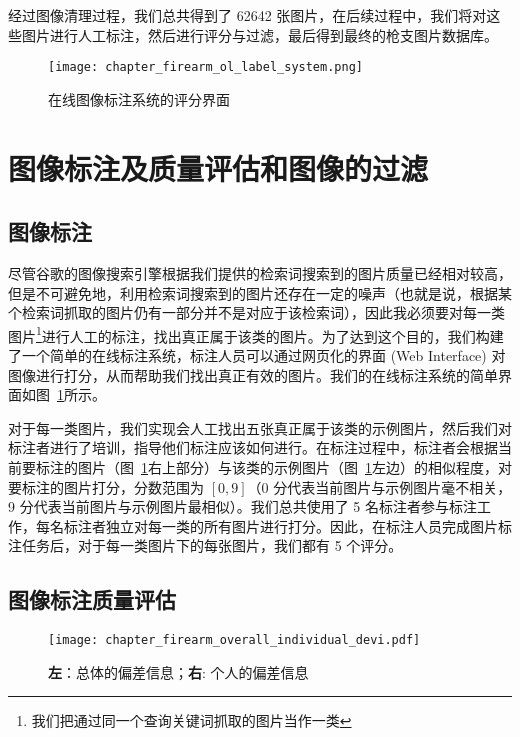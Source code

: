 经过图像清理过程，我们总共得到了 62642 张图片，在后续过程中，我们将对这些图片进行人工标注，然后进行评分与过滤，最后得到最终的枪支图片数据库。
\begin{figure}[t]
	\centering
	\texttt{[image: chapter\_firearm\_ol\_label\_system.png]}
	\caption{在线图像标注系统的评分界面}
	\label{fig:online_label_system}
\end{figure}

\section{图像标注及质量评估和图像的过滤}\label{sec:image_label_filtering}

\subsection{图像标注}
尽管谷歌的图像搜索引擎根据我们提供的检索词搜索到的图片质量已经相对较高，但是不可避免地，利用检索词搜索到的图片还存在一定的噪声（也就是说，根据某个检索词抓取的图片仍有一部分并不是对应于该检索词），因此我必须要对每一类图片\footnote{我们把通过同一个查询关键词抓取的图片当作一类}进行人工的标注，找出真正属于该类的图片。为了达到这个目的，我们构建了一个简单的在线标注系统，标注人员可以通过网页化的界面 (Web Interface) 对图像进行打分，从而帮助我们找出真正有效的图片。我们的在线标注系统的简单界面如图~\ref{fig:online_label_system}所示。


对于每一类图片，我们实现会人工找出五张真正属于该类的示例图片，然后我们对标注者进行了培训，指导他们标注应该如何进行。在标注过程中，标注者会根据当前要标注的图片（图~\ref{fig:online_label_system}右上部分）与该类的示例图片（图~\ref{fig:online_label_system}左边）的相似程度，对要标注的图片打分，分数范围为 $[0,9]$（0 分代表当前图片与示例图片毫不相关，9 分代表当前图片与示例图片最相似）。我们总共使用了 5 名标注者参与标注工作，每名标注者独立对每一类的所有图片进行打分。因此，在标注人员完成图片标注任务后，对于每一类图片下的每张图片，我们都有 5 个评分。

\subsection{图像标注质量评估}

\begin{figure}[t]
	\centering
	\texttt{[image: chapter\_firearm\_overall\_individual\_devi.pdf]}
	\caption{\textbf{左}：总体的偏差信息；\textbf{右}: 个人的偏差信息}
	\label{fig:deviation_info}
\end{figure}

